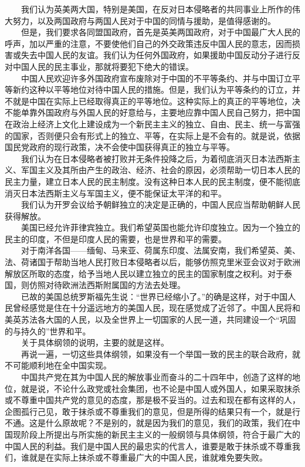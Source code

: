 \documentclass[cn,11pt,chinese]{elegantbook}
\begin{document}
　　我们认为英美两大国，特别是美国，在反对日本侵略者的共同事业上所作的伟大努力，以及两国政府与两国人民对于中国的同情与援助，是值得感谢的。\\
　　但是，我们要求各同盟国政府，首先是英美两国政府，对于中国最广大人民的呼声，加以严重的注意，不要使他们自己的外交政策违反中国人民的意志，因而损害或失去中国人民的友谊。我们认为任何外国政府，如果援助中国反动分子进行反对中国人民的民主事业，那就将要犯下绝大的错误。\\
　　中国人民欢迎许多外国政府宣布废除对于中国的不平等条约、并与中国订立平等新约这种以平等地位对待中国人民的措施。但是，我们认为平等条约的订立，并不就是中国在实际上已经取得真正的平等地位。这种实际上的真正的平等地位，决不能单靠外国政府与外国人民的好意给与，主要地应靠中国人民自己努力，把中国在政治上经济上文化上建设成为一个新民主主义的独立、自由、民主、统一与富强的国家，否则便只会有形式上的独立、平等，在实际上是不会有的。就是说，依据国民党政府的现行政策，决不会使中国获得真正的独立与平等。\\
　　我们认为在日本侵略者被打败并无条件投降之后，为着彻底消灭日本法西斯主义、军国主义及其所由产生的政治、经济、社会的原因，必须帮助一切日本人民的民主力量，建立日本人民的民主制度。没有这种日本人民的民主制度，便不能彻底消灭日本法西斯主义与军国主义，便不能保证太平洋的和平。\\
　　我们认为开罗会议给予朝鲜独立的决定是正确的，中国人民应当帮助朝鲜人民获得解放。\\
　　美国已经允许菲律宾独立。我们希望英国也能允许印度独立。因为一个独立的民主的印度，不但是印度人民的需要，也是世界和平的需要。\\
　　对于南洋各国——缅甸、马来亚、荷属东印度、法属安南，我们希望英、美、法、荷诸国于帮助当地人民打败日本侵略者以后，能够仿照克里米亚会议对于欧洲解放区所取的态度，给予当地人民以建立独立的民主的国家制度之权利。对于泰国，则仿照对待欧洲法西斯附属国的方法去处理。\\
　　已故的美国总统罗斯福先生说：“世界已经缩小了。”的确是这样，对于中国人民曾经感觉是住在十分遥远地方的美国人民，现在感觉成了近邻了。中国人民将和美英苏法各大国的人民，以及全世界上一切国家的人民一道，共同建设一个“巩固的与持久的”世界和平。\\
　　关于具体纲领的说明，主要的就是这样。\\
　　再说一遍，一切这些具体纲领，如果没有一个举国一致的民主的联合政府，就不可能顺利地在全中国实现。\\
　　中国共产党在其为中国人民的解放事业而奋斗的二十四年中，创造了这样的地位，就是说，不论什么政党或社会集团，也不论是中国人或外国人，如果采取抹杀或不尊重中国共产党的意见的态度，那是极不妥当的。过去和现在都有这样的人，企图孤行己见，敢于抹杀或不尊重我们的意见，但是所得的结果只有一个，就是行不通。这是什么原故呢？不是别的，就是因为我们的意见，我们的政策，我们在中国现阶段上所提出与所实施的新民主主义的一般纲领与具体纲领，符合于最广大的中国人民的利益。我们是中国人民的最忠实的代言人，谁要是敢于抹杀或不尊重我们，谁就是在实际上抹杀或不尊重最广大的中国人民，谁就难免要失败。\\
\end{document}
